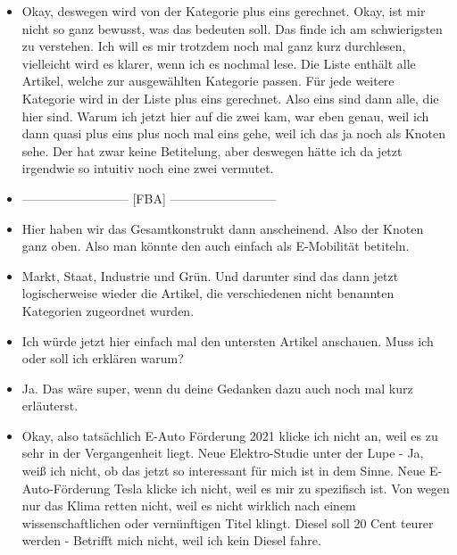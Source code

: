 {\begin{itemize}[]
            \item {} Okay, deswegen wird von der Kategorie plus eins gerechnet.
                  Okay, ist mir nicht so ganz bewusst, was das bedeuten soll.
                  Das finde ich am schwierigsten zu verstehen.
                  Ich will es mir trotzdem noch mal ganz kurz durchlesen, vielleicht wird es klarer, wenn ich es nochmal lese.
                  Die Liste enthält alle Artikel, welche zur ausgewählten Kategorie passen.
                  Für jede weitere Kategorie wird in der Liste plus eins gerechnet.
                  Also eins sind dann alle, die hier sind.
                  Warum ich jetzt hier auf die zwei kam, war eben genau, weil ich dann quasi plus eins plus noch mal eins gehe, weil ich das ja noch als Knoten sehe.
                  Der hat zwar keine Betitelung, aber deswegen hätte ich da jetzt irgendwie so intuitiv noch eine zwei vermutet.
            \item {--------------------------} [FBA] {--------------------------}
            \item {} Hier haben wir das Gesamtkonstrukt dann anscheinend.
                  Also der Knoten ganz oben.
                  Also man könnte den auch einfach als E-Mobilität betiteln.
            \item {} Markt, Staat, Industrie und Grün.
                  Und darunter sind das dann jetzt logischerweise wieder die Artikel, die verschiedenen nicht benannten Kategorien zugeordnet wurden.
            \item {} Ich würde jetzt hier einfach mal den untersten Artikel anschauen. Muss ich oder soll ich erklären warum?
            \item {} Ja. Das wäre super, wenn du deine Gedanken dazu auch noch mal kurz erläuterst.
            \item {} Okay, also tatsächlich \flqq E-Auto Förderung 2021\frqq{} klicke ich nicht an, weil es zu sehr in der Vergangenheit liegt.
                  \flqq Neue Elektro-Studie unter der Lupe\frqq{} - Ja, weiß ich nicht, ob das jetzt so interessant für mich ist in dem Sinne.
                  \flqq Neue E-Auto-Förderung Tesla\frqq{} klicke ich nicht, weil es mir zu spezifisch ist.
                  \flqq Von wegen nur das Klima retten\frqq{} nicht, weil es nicht wirklich nach einem wissenschaftlichen oder vernünftigen Titel klingt.
                  \flqq Diesel soll 20 Cent teurer werden\frqq{} - Betrifft mich nicht, weil ich kein Diesel fahre.

\end{itemize}}
